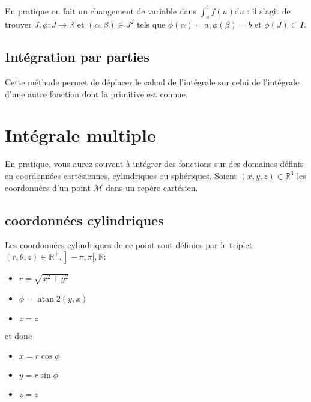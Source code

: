 En pratique on fait un changement de variable dans $\int_a^b f(u) \mathrm{d} u$ : il s'agit de trouver $J, \phi: J \rightarrow \mathbb{R}$ et $(\alpha, \beta) \in J^2$ tels que $\phi(\alpha)=a, \phi(\beta)=b$ et $\phi(J) \subset I$.

\subsection{Intégration par parties}


Cette méthode permet de déplacer le calcul de l'intégrale sur celui de l'intégrale d'une autre fonction dont la primitive est connue.

\section{Intégrale multiple}


En pratique, vous aurez souvent à intégrer des fonctions sur des domaines définis en coordonnées cartésiennes, cylindriques ou sphériques. Soient $(x, y, z) \in \mathbb{R}^3$ les coordonnées d'un point $\mathcal{M}$ dans un repère cartésien. 

\subsection*{coordonnées cylindriques}
Les coordonnées cylindriques de ce point sont définies par le triplet $(r, \theta, z) \in \left.\mathbb{R}^{+},\right]-\pi, \pi[, \mathbb{R}:$

\begin{itemize}
    \item $r=\sqrt{x^2+y^2}$
    \item $\phi=\operatorname{atan} 2(y, x)$
    \item $z=z$
\end{itemize}
et donc 
\begin{itemize}
    \item $x=r \cos \phi$
    \item $y=r \sin \phi$
    \item $z=z$
\end{itemize}

